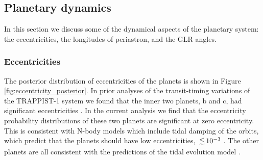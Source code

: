 \documentclass[fleqn,usenatbib]{mnras} %
\begin{document}
\subsection{Planetary dynamics}



In this section we discuss some of the dynamical aspects of the planetary system: the  eccentricities, the longitudes of periastron, and the GLR angles. 

\subsubsection{Eccentricities}

The posterior distribution of eccentricities of the planets is shown
in Figure \ref{fig:eccentricity_posterior}.  In prior analyses of
the transit-timing variations of the TRAPPIST-1 system we found that
the inner two planets, b and c, had significant eccentricities \citep{Grimm2018}.
In the current analysis we find that the eccentricity probability
distributions of these two planets are significant at zero eccentricity.
This is consistent with N-body models which include tidal damping of
the orbits, which predict that the planets should have low eccentricities,
$\la 10^{-3}$ \citep{Luger2017a,Turbet2018}.  The other planets are
all consistent with the predictions of the tidal evolution model
\citep{Luger2017b}. 

\end{document}

